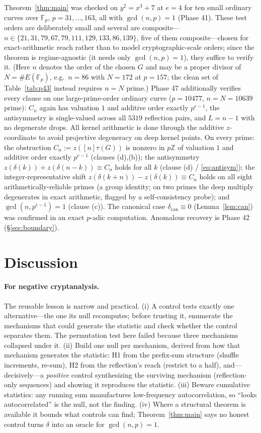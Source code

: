 \documentclass[11pt]{article}
\theoremstyle{definition}
\newcommand{\Fp}{\mathbb{F}_p}
\newcommand{\Z}{\mathbb{Z}}
\begin{document}
Theorem~\ref{thm:main} was checked on $y^2=x^3+7$ at $e=4$ for ten
small ordinary curves over $\Fp$, $p=31,\dots,163$, all with
$\gcd(n,p)=1$ (Phase 41). These test orders are deliberately small and
several are composite---$n\in\{21,31,79,67,79,111,129,133,86,139\}$, five
of them composite---chosen for exact-arithmetic reach rather than to model
cryptographic-scale orders; since the theorem is regime-agnostic (it
needs only $\gcd(n,p)=1$), they suffice to verify it. (Here $n$ denotes
the order of the chosen $G$ and may be a proper divisor of $N=\#E(\Fp)$,
e.g.\ $n=86$ with $N=172$ at $p=157$; the clean set of
Table~\ref{tab:p43} instead requires $n=N$ prime.) Phase 47 additionally
verifies every clause on one large-prime-order ordinary curve
($p=10477$, $n=N=10639$ prime): $C_n$ again has valuation $1$ and
additive order exactly $p^{e-1}$, the antisymmetry is single-valued
across all $5319$ reflection pairs, and $L=n-1$ with no degenerate
drops. All kernel arithmetic is done through the
additive $z$-coordinate to avoid projective degeneracy on deep kernel
points. On every prime: the
obstruction $C_n:=z([n]\tau(G))$ is nonzero in $p\Z$ of valuation $1$ and
additive order exactly $p^{e-1}$ (clauses (d),(b)); the antisymmetry
$z(\delta(k))+z(\delta(n-k))\equiv C_n$ holds for all $k$ (clause (d) /
\eqref{eq:antisym}); the integer-representative shift
$z(\delta(k+n))-z(\delta(k))\equiv C_n$ holds on all eight
arithmetically-reliable primes (a group identity; on two primes the deep
multiply degenerates in exact arithmetic, flagged by a self-consistency
probe); and $\gcd(n,p^{e-1})=1$ (clause (c)). The canonical case
$\delta_{\mathrm{can}}\equiv 0$ (Lemma~\ref{lem:can}) was confirmed in an
exact $p$-adic computation. Anomalous recovery is Phase 42
(\S\ref{sec:boundary}).

\section{Discussion}\label{sec:discussion}

\paragraph{For negative cryptanalysis.} The reusable lesson is narrow and
practical. (i) A control tests exactly one alternative---the one its null
recomputes; before trusting it, enumerate the mechanisms that could
generate the statistic and check whether the control separates them. The
permutation test here failed because three mechanisms collapsed under it.
(ii) Build one null per mechanism, derived from how that mechanism
generates the statistic: H1 from the prefix-sum structure (shuffle
increments, re-sum), H2 from the reflection's reach (restrict to a half),
and---decisively---a \emph{positive} control synthesizing the surviving
mechanism (reflection-only sequences) and showing it reproduces the
statistic. (iii) Beware cumulative statistics: any running sum
manufactures low-frequency autocorrelation, so ``looks autocorrelated''
is the null, not the finding. (iv) Where a structural theorem is
available it bounds what controls can find; Theorem~\ref{thm:main} says no
honest control turns $\delta$ into an oracle for $\gcd(n,p)=1$.
\end{document}
